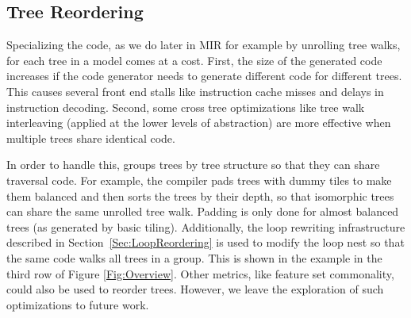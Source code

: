 \subsection{Tree Reordering}
\label{sec:treeorder}	
Specializing the code, as we do later in MIR for example by unrolling tree walks, for each tree in a model comes at a cost.
First, the size of the generated code increases if the
code generator needs to generate different code for different trees. This causes several front end stalls like instruction 
cache misses and delays in instruction decoding. Second, some cross tree optimizations 
like tree walk interleaving (applied at the lower levels of abstraction) are more effective when multiple trees share identical code. 

In order to handle this, \Treebeard{} groups trees by tree structure so that they can 
share traversal code. For example, the compiler pads trees with dummy tiles to make them balanced and then sorts the trees by 
their depth, so that isomorphic trees can share the same unrolled tree walk. Padding is only done for almost balanced trees (as generated 
by basic tiling). Additionally, the loop rewriting infrastructure described in Section~\ref{Sec:LoopReordering} is used 
to modify the loop nest so that the same code walks all trees in a group. 
This is shown in the example in the third row of Figure \ref{Fig:Overview}. Other metrics, like feature set commonality, 
could also be used to reorder trees\cite{Tahoe}. However, we leave the exploration of such optimizations to future work.

